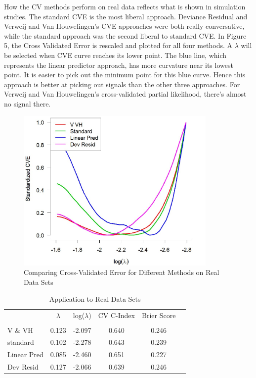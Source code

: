 \par How the CV methods perform on real data reflects what is shown in simulation studies. The standard CVE is the most liberal approach. Deviance Residual and Verweij and Van Houwelingen's CVE approaches were both really conversative, while the standard approach was the second liberal to standard CVE. In Figure 5, the Cross Validated Error is rescaled and plotted for all four methods. A $\lambda$ will be selected when CVE curve reaches its lower point. The blue line, which represents the linear predictor approach, has more curvature near its lowest point. It is easier to pick out the minimum point for this blue curve. Hence this approach is better at picking out signals than the other three approaches. For Verweij and Van Houwelingen's cross-validated partial likelihood, there's almost no signal there.

\begin{figure}[h]
    \centering
		\includegraphics[height= 8cm ]{./figures/shedden.jpg}
    \caption{Comparing Cross-Validated Error for Different Methods on Real Data Sets}
\end{figure}	

\begin{table}[h]
\centering
\caption{Application to Real Data Sets}
\label{my-label}
\begin{tabular}{lccccc}
\toprule
						& $\lambda$ & log($\lambda$) & CV C-Index & Brier Score \\ 
						\cline{2-5} \\ 
						V $\&$ VH& 0.123 & -2.097 & 0.640 & 0.246\\
						standard & 0.102 & -2.278 & 0.643& 0.239\\
						Linear Pred &0.085 & -2.460 & 0.651&  0.227\\
						Dev Resid & 0.127& -2.066 & 0.639& 0.246\\ 
						\bottomrule
\end{tabular}
\end{table}

